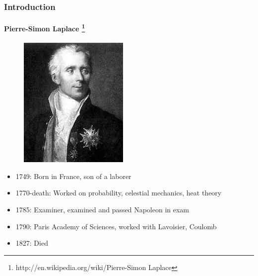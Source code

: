 \documentclass[hyperref={pdfpagelabels=true}]{beamer}
\begin{document}
\begin{frame}
\frametitle{Introduction}
\framesubtitle{Pierre-Simon Laplace \tiny{\footnote{http://en.wikipedia.org/wiki/Pierre-Simon Laplace}}}
\begin{figure}[!tbp]
\centering
\includegraphics[scale = 0.35]{figs/zxc.jpg}
\end{figure}
\small{
\begin{itemize}
\item 1749: Born in France, son of a laborer
\item 1770-death: Worked on probability, celestial
mechanics, heat theory
\item 1785: Examiner, examined and passed Napoleon in
exam
\item 1790: Paris Academy of Sciences, worked with
Lavoisier, Coulomb
\item 1827: Died
\end{itemize}}
\end{frame}
\end{document}

